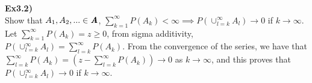 \documentclass[12pt,mythesisstyle]{report}
\begin{document}
\\
\\
\textbf{Ex3.2)}\\
Show that $A_1, A_2,...\in\textbf{\textit{A}}$, $\sum_{k=1}^{\infty} P(A_k)<\infty \implies P(\cup_{l=k}^{\infty}A_l)\rightarrow 0$ if $k\rightarrow\infty$. Let $\sum_{k=1}^{\infty} P(A_k)=z\geq0$, from sigma additivity, $P(\cup_{l=k}^{\infty}A_l)=\sum_{l=k}^{\infty}P(A_k)$. From the convergence of the series, we have that $\sum_{l=k}^{\infty}P(A_k)=(z-\sum_{l=k}^{\infty}P(A_k))\rightarrow 0$ as $k\rightarrow\infty$, and this proves that $P(\cup_{l=k}^{\infty}A_l)\rightarrow 0$ if $k\rightarrow\infty$.
\end{document}
